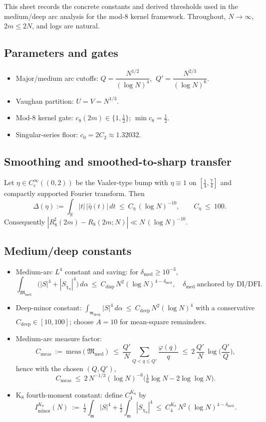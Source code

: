 \documentclass[11pt]{article}
\theoremstyle{definition}
\theoremstyle{remark}
\begin{document}
This sheet records the concrete constants and derived thresholds used in the medium/deep arc analysis for the mod-8 kernel framework. Throughout, $N\to\infty$, $2m\le 2N$, and logs are natural.

\subsection*{Parameters and gates}
\begin{itemize}
  \item Major/medium arc cutoffs: $Q=\dfrac{N^{1/2}}{(\log N)^4}$, $\ Q'=\dfrac{N^{2/3}}{(\log N)^6}$.
  \item Vaughan partition: $U=V=N^{1/3}$.
  \item Mod-8 kernel gate: $c_8(2m)\in\{1,\tfrac12\}$; $\min c_8=\tfrac12$.
  \item Singular-series floor: $c_0=2C_2\approx 1.32032$.
\end{itemize}

\subsection*{Smoothing and smoothed-to-sharp transfer}
Let $\eta\in C_c^{\infty}((0,2))$ be the Vaaler-type bump with $\eta\equiv 1$ on $[\tfrac14,\tfrac74]$ and compactly supported Fourier transform. Then
\[
\Delta(\eta):=\int_{\mathbb R}|t|\,|\widehat{\eta}(t)|\,dt\ \le\ C_{\eta}\,(\log N)^{-10},\qquad C_{\eta}\ \le\ 100.
\]
Consequently $|R_8^{\sharp}(2m)-R_8(2m;N)|\ll N\,(\log N)^{-10}$.

\subsection*{Medium/deep constants}
\begin{itemize}
  \item Medium-arc $L^4$ constant and saving: for $\delta_{\mathrm{med}}\ge 10^{-3}$,
  \[
    \int_{\mathfrak M_{\mathrm{med}}}\big(|S|^4+|S_{\chi_8}|^4\big)\,d\alpha\ \le\ C_{\mathrm{disp}}\,N^2(\log N)^{4-\delta_{\mathrm{med}}},\quad \delta_{\mathrm{med}}\ \text{anchored by DI/DFI.}
  \]
  \item Deep-minor constant: $\displaystyle \int_{\mathfrak m_{\mathrm{deep}}}|S|^4\,d\alpha\ \le\ C_{\mathrm{deep}}\,N^2(\log N)^4$ with a conservative $C_{\mathrm{deep}}\in[10,100]$; choose $A=10$ for mean-square remainders.
  \item Medium-arc measure factor:
  \[
    C_{\mathrm{meas}}\ :=\ \mathrm{meas}(\mathfrak M_{\mathrm{med}})\ \le\ \frac{Q'}{N}\sum_{Q<q\le Q'}\frac{\varphi(q)}{q}\ \le\ 2\,\frac{Q'}{N}\,\log\!\Big(\frac{Q'}{Q}\Big),
  \]
  hence with the chosen $(Q,Q')$,
  \[
    C_{\mathrm{meas}}\ \le\ 2\,N^{-1/3}(\log N)^{-6}\Big(\tfrac16\log N-2\log\log N\Big).
  \]
  \item K$_8$ fourth-moment constant: define $C_4^{K_8}$ by
  \[
    I_{\mathrm{minor}}^{K_8}(N)\ :=\ \tfrac12\!\int_{\mathfrak m}|S|^4+\tfrac12\!\int_{\mathfrak m}|S_{\chi_8}|^4\ \le\ C_4^{K_8}\,N^2(\log N)^{4-\delta_{\mathrm{med}}}.
  \]
\end{itemize}
\end{document}
